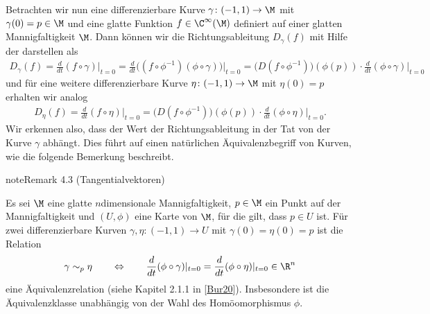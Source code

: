 \documentclass[letterpaper,10pt,english]{jupyterBook}
\begin{document}
\sphinxAtStartPar
Betrachten wir nun eine differenzierbare Kurve \(\gamma \colon (-1, 1) \rightarrow \M\) mit \(\gamma(0)=p \in \M\) und eine glatte Funktion \(f \in \C^\infty(\M)\) definiert auf einer glatten Mannigfaltigkeit \(\M\).
Dann können wir die Richtungsableitung \(D_\gamma(f)\) mit Hilfe der  darstellen als
\begin{equation*}
\begin{split}D_\gamma(f) = \frac{d}{dt}(f\circ \gamma)\big\rvert_{t=0} = \frac{d}{dt}\big( (f\circ \phi^{-1}) (\phi \circ \gamma) \big)\rvert_{t=0} = 
\big(D(f\circ \phi^{-1})\big)(\phi(p))\cdot \frac{d}{dt}(\phi \circ \gamma)\rvert_{t=0}\end{split}
\end{equation*}
\sphinxAtStartPar
und für eine weitere differenzierbare Kurve \(\eta \colon (-1, 1) \rightarrow \M\) mit \(\eta(0)=p\) erhalten wir analog
\begin{equation*}
\begin{split}D_\eta(f) = \frac{d}{dt}(f\circ \eta)\big\rvert_{t=0} = 
\big(D(f\circ \phi^{-1})\big)(\phi(p))\cdot \frac{d}{dt}(\phi \circ \eta)\rvert_{t=0}.\end{split}
\end{equation*}
\sphinxAtStartPar
Wir erkennen also, dass der Wert der Richtungsableitung in der Tat von der Kurve \(\gamma\) abhängt.
Dies führt auf einen natürlichen Äquivalenzbegriff von Kurven, wie die folgende Bemerkung beschreibt.
\label{manifolds/tangential:rem:tang}
\begin{sphinxadmonition}{note}{Remark 4.3 (Tangentialvektoren)}



\sphinxAtStartPar
Es sei \(\M\) eine glatte \(n\)\sphinxhyphen{}dimensionale Mannigfaltigkeit, \(p\in\M\) ein Punkt auf der Mannigfaltigkeit und \((U,\phi)\) eine Karte von \(\M\), für die gilt, dass \(p\in U\) ist.
Für zwei differenzierbare Kurven \(\gamma, \eta:(-1,1) \to U\) mit \(\gamma(0) = \eta(0) = p\) ist die Relation
\begin{equation*}
\begin{split}\gamma \sim_p \eta
\qquad \Leftrightarrow \qquad
\frac{d}{dt}(\phi \circ \gamma)\rvert_{t=0} = \frac{d}{dt}(\phi \circ \eta)\rvert_{t=0}\in \R^n\end{split}
\end{equation*}
\sphinxAtStartPar
eine Äquivalenzrelation (siehe Kapitel 2.1.1 in {[}\hyperlink{cite.references:id2}{Bur20}{]}).
Insbesondere ist die Äquivalenzklasse unabhängig von der Wahl des Homöomorphismus \(\phi\).
\end{sphinxadmonition}
\end{document}
